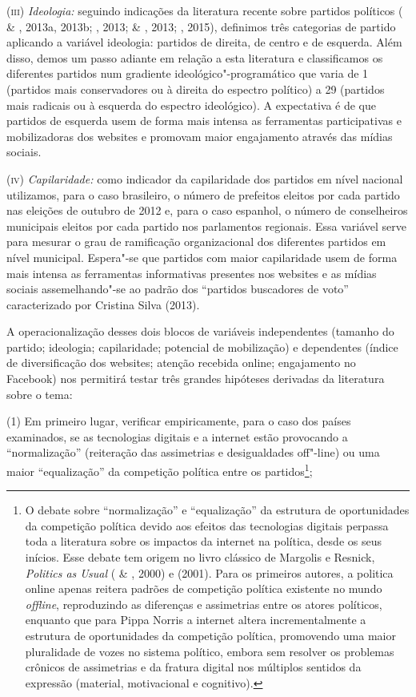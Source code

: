 (\textsc{iii}) \emph{Ideologia:} seguindo indicações da literatura
recente sobre partidos políticos ( \& , 2013a, 2013b;
, 2013;  \& , 2013; , 2015), definimos três
categorias de partido aplicando a variável ideologia: partidos de
direita, de centro e de esquerda. Além disso, demos um passo adiante em
relação a esta literatura e classificamos os diferentes partidos num
gradiente ideológico"-programático que varia de 1 (partidos mais
conservadores ou à direita do espectro político) a 29 (partidos mais
radicais ou à esquerda do espectro ideológico). A expectativa é de que
partidos de esquerda usem de forma mais intensa as ferramentas
participativas e mobilizadoras dos websites e promovam maior engajamento
através das mídias sociais.

(\textsc{iv}) \emph{Capilaridade:} como indicador da capilaridade dos partidos
em nível nacional utilizamos, para o caso brasileiro, o número de
prefeitos eleitos por cada partido nas eleições de outubro de 2012 e,
para o caso espanhol, o número de conselheiros municipais eleitos por
cada partido nos parlamentos regionais. Essa variável serve para mesurar
o grau de ramificação organizacional dos diferentes partidos em nível
municipal. Espera"-se que partidos com maior capilaridade usem de forma
mais intensa as ferramentas informativas presentes nos websites e as
mídias sociais assemelhando"-se ao padrão dos ``partidos buscadores de
voto'' caracterizado por Cristina Silva (2013).

A operacionalização desses dois blocos de variáveis independentes
(tamanho do partido; ideologia; capilaridade; potencial de mobilização)
e dependentes (índice de diversificação dos websites; atenção recebida
online; engajamento no Facebook) nos permitirá testar três grandes
hipóteses derivadas da literatura sobre o tema:

(1) Em primeiro lugar, verificar empiricamente, para o caso dos países
examinados, se as tecnologias digitais e a internet estão provocando a
``normalização'' (reiteração das assimetrias e desigualdades off"-line)
ou uma maior ``equalização'' da competição política entre os
partidos\footnote{O debate sobre ``normalização'' e ``equalização'' da
  estrutura de oportunidades da competição política devido aos efeitos
  das tecnologias digitais perpassa toda a literatura sobre os impactos
  da internet na política, desde os seus inícios. Esse debate tem origem
  no livro clássico de Margolis e Resnick, \emph{Politics as Usual}
  ( \& , 2000) e  (2001). Para os primeiros
  autores, a politica online apenas reitera padrões de competição
  política existente no mundo \emph{offline}, reproduzindo as diferenças
  e assimetrias entre os atores políticos, enquanto que para Pippa
  Norris a internet altera incrementalmente a estrutura de oportunidades
  da competição política, promovendo uma maior pluralidade de vozes no
  sistema político, embora sem resolver os problemas crônicos de
  assimetrias e da fratura digital nos múltiplos sentidos da expressão
  (material, motivacional e cognitivo).};

